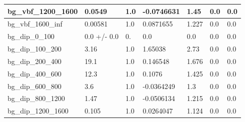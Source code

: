 \documentclass[a4paper, 10pt]{article}
\begin{document}
\begin{table}[H]
\begin{center}
\begin{tabular}{|m{23.0mm}|m{23.0mm}|m{18.0mm}|m{19.0mm}|m{19.0mm}|m{19.0mm}|m{19.0mm}|}
      \hline
      {\cellcolor{white}         bg\_vbf\_1200\_1600}& {\cellcolor{white}         0.0549}& {\cellcolor{white}         1.0}& {\cellcolor{white}         -0.0746631}& {\cellcolor{white}         1.45}& {\cellcolor{green}         0.0}& {\cellcolor{green}         0.0}\\
      \hline
      {\cellcolor{white}         bg\_vbf\_1600\_inf}& {\cellcolor{white}         0.00581}& {\cellcolor{white}         1.0}& {\cellcolor{white}         0.0871655}& {\cellcolor{white}         1.227}& {\cellcolor{green}         0.0}& {\cellcolor{green}         0.0}\\
      \hline
      {\cellcolor{white}         bg\_dip\_0\_100}& {\cellcolor{white}         0.0 +/\-- 0.0}& {\cellcolor{white}         0.}& {\cellcolor{white}         0.0}& {\cellcolor{white}         0.0}& {\cellcolor{green}         0.0}& {\cellcolor{green}         0.0}\\
      \hline
      {\cellcolor{white}         bg\_dip\_100\_200}& {\cellcolor{white}         3.16}& {\cellcolor{white}         1.0}& {\cellcolor{white}         1.65038}& {\cellcolor{white}         2.73}& {\cellcolor{green}         0.0}& {\cellcolor{green}         0.0}\\
      \hline
      {\cellcolor{white}         bg\_dip\_200\_400}& {\cellcolor{white}         19.1}& {\cellcolor{white}         1.0}& {\cellcolor{white}         0.146548}& {\cellcolor{white}         1.676}& {\cellcolor{green}         0.0}& {\cellcolor{green}         0.0}\\
      \hline
      {\cellcolor{white}         bg\_dip\_400\_600}& {\cellcolor{white}         12.3}& {\cellcolor{white}         1.0}& {\cellcolor{white}         0.1076}& {\cellcolor{white}         1.425}& {\cellcolor{green}         0.0}& {\cellcolor{green}         0.0}\\
      \hline
      {\cellcolor{white}         bg\_dip\_600\_800}& {\cellcolor{white}         3.6}& {\cellcolor{white}         1.0}& {\cellcolor{white}         -0.0364249}& {\cellcolor{white}         1.3}& {\cellcolor{green}         0.0}& {\cellcolor{green}         0.0}\\
      \hline
      {\cellcolor{white}         bg\_dip\_800\_1200}& {\cellcolor{white}         1.47}& {\cellcolor{white}         1.0}& {\cellcolor{white}         -0.0506134}& {\cellcolor{white}         1.215}& {\cellcolor{green}         0.0}& {\cellcolor{green}         0.0}\\
      \hline
      {\cellcolor{white}         bg\_dip\_1200\_1600}& {\cellcolor{white}         0.105}& {\cellcolor{white}         1.0}& {\cellcolor{white}         0.0264047}& {\cellcolor{white}         1.124}& {\cellcolor{green}         0.0}& {\cellcolor{green}         0.0}\\

\end{tabular}
\end{center}
\end{table}
\end{document}
